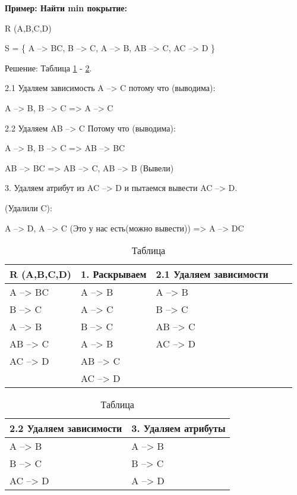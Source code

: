 \textbf{Пример: Найти min покрытие:}

R (A,B,C,D)

S =
\{
A --> BC,
B --> C,
A --> B,
AB --> C,
AC --> D
\}

Решение: Таблица \ref{fig:ref13} - \ref{fig:ref14}.

2.1 Удаляем зависимость A --> C потому что (выводима):

A --> B, B --> C => A --> C

2.2 Удаляем AB --> C Потому что (выводима):

A --> B, B --> C => AB --> BC

AB --> BC => AB --> C, AB --> B (Вывели)

3. Удаляем атрибут из AC --> D и пытаемся вывести AC --> D.

(Удалили C):

A --> D, A --> C (Это у нас есть(можно вывести)) => A --> DC

\begin{table}[ht]
	\centering
	\begin{tabular}{ | l | l | l | l | l |}
		\hline
		R (A,B,C,D) & 1. Раскрываем & 2.1 Удаляем зависимости \\ \hline
		A --> BC    & A --> B       & A --> B                 \\ \hline
		B --> C     & A --> C       & B --> C                 \\ \hline
		A --> B     & B --> C       & AB --> C                \\ \hline
		AB --> C    & A --> B       & AC --> D                \\ \hline
		AC --> D    & AB --> C      &                         \\ \hline
		            & AC --> D      &                         \\ \hline
		\hline
	\end{tabular}
	\caption{Таблица}
	\label{fig:ref13}
\end{table}

\begin{table}[ht]
	\centering
	\begin{tabular}{ | l | l |}
		\hline
		2.2 Удаляем зависимости & 3. Удаляем атрибуты \\ \hline
		A --> B                 & A --> B             \\ \hline
		B --> C                 & B --> C             \\ \hline
		AC --> D                & A --> D             \\ \hline
		\hline
	\end{tabular}
	\caption{Таблица}
	\label{fig:ref14}
\end{table}


